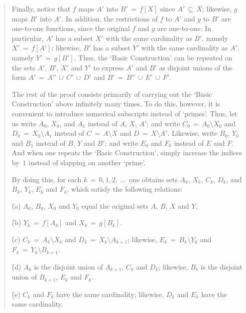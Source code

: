 {\begin{quotation}
{        Finally, notice that $f$ maps $A'$ into $B' \,=\, f[X]$ since $A' \,{\subseteq}\, X$; likewise, $g$ maps $B'$ into $A'$.
    In addition, the restrictions of $f$ to $A'$ and $g$ to $B'$ are one-to-one functions, since the original $f$ and $g$ are one-to-one.
    In particular, $A'$ has a subset $X'$ with the same cardinality as $B'$, namely $X' \,=\, f[A']$;
    likewise, $B'$ has a subset $Y'$ with the same cardinality as $A'$, namely $Y' \,=\, g[B']$.
    Thus, the `Basic Construction' can be repeated on the sets $A'$, $B'$, $X'$ and $Y'$ to express $A'$ and $B'$ as disjoint unions of the form $A' \,=\, A''\,{\cup}\,C'\,{\cup}\,D'$ and $B' \,=\, B''\,{\cup}\,E'\,{\cup}\,F'$.


\V

        The rest of the proof consists primarily of carrying out the `Basic Construction' above infinitely many times.
    To do this, however, it is convenient to introduce numerical subscripts instead of `primes'.
    Thus, let us write $A_{0}$, $X_{0}$, and $A_{1}$ instead of $A$, $X$, $A'$; and write $C_{0} \,=\, A_{0}{\setminus}X_{0}$ and $D_{0} \,=\, X_{0}{\setminus}A_{1}$ 
    instead of $C \,=\, A{\setminus}X$ and $D \,=\, X{\setminus}A'$.
    Likewise, write $B_{0}$, $Y_{0}$ and $B_{1}$ instead of $B$, $Y$ and $B'$; and write $E_{0}$ and $F_{0}$ instead of $E$ and $F$.
    And when one repeats the `Basic Construction', simply increase the indices by~$1$ instead of slapping on another `prime'.

        By doing this, for each $k \,=\, 0,1,2,\,{\ldots}\,$ one obtains sets $A_{k}$, $X_{k}$, $C_{k}$, $D_{k}$, and $B_{k}$, $Y_{k}$, $E_{k}$ and $F_{k}$, which satisfy the following relations:

\V

        \h (a) $A_{0}$, $B_{0}$, $X_{0}$ and $Y_{0}$ equal the original sets $A$, $B$, $X$ and $Y$.

        \h (b) $Y_{k} \,=\, f[A_{k}]$ and $X_{k} \,=\, g[B_{k}]$.

        \h (c) $C_{k} \,=\, A_{k}{\setminus}X_{k}$ and $D_{k} \,=\, X_{k}{\setminus}A_{k+1}$;
    likewise, $E_{k} \,=\, B_{k}{\setminus}Y_{k}$ and $F_{k} \,=\, Y_{k}{\setminus}B_{k+1}$.

        \h (d) $A_{k}$ is the disjoint union of $A_{k+1}$, $C_{k}$ and $D_{k}$;
    likewise, $B_{k}$ is the disjoint union of $B_{k+1}$, $E_{k}$ and $F_{k}$.

        \h (e) $C_{k}$ and $F_{k}$ have the same cardinality; likewise, $D_{k}$ and $E_{k}$ have the same cardinality.

}
\end{quotation}}
